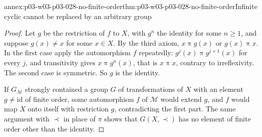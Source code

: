 \begin{annexitem}{annex:p03-w03-p03-028-no-finite-order}{thm:p03-w03-p03-028-no-finite-order}{Infinite cyclic cannot be replaced by an arbitrary group}
\begin{proof}
Let \(g\) be the restriction of \(f\) to \(X\), with \(g^n\) the identity
for some \(n\geq1\), and suppose \(g(x)\neq x\) for some \(x\in X\).  By
the third axiom, \(x\mathrel\pi g(x)\) or \(g(x)\mathrel\pi x\).  In the
first case apply the automorphism \(f\) repeatedly: \(g^j(x)\mathrel\pi
g^{j+1}(x)\) for every \(j\), and transitivity gives
\(x\mathrel\pi g^n(x)\), that is \(x\mathrel\pi x\), contrary to
irreflexivity.  The second case is symmetric.  So \(g\) is the identity.

If \(G_{\mathcal M}\) strongly contained a group \(G\) of transformations
of \(X\) with an element \(g\neq\mathrm{id}\) of finite order, some
automorphism \(f\) of \(\mathcal M\) would extend \(g\), and \(f\) would
map \(X\) onto itself with restriction \(g\), contradicting the first
part.  The same argument with \(\prec\) in place of \(\pi\) shows that
\(G(X,\prec)\) has no element of finite order other than the identity.
\end{proof}
\end{annexitem}

